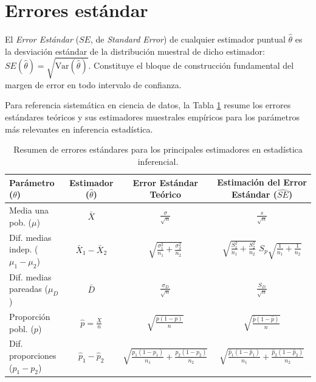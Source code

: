 \section{Errores estándar}

El \emph{Error Estándar} ($SE$, de \emph{Standard Error}) de cualquier estimador puntual $\hat{\theta}$ es la desviación estándar de la distribución muestral de dicho estimador: $SE(\hat{\theta}) = \sqrt{\text{Var}(\hat{\theta})}$. Constituye el bloque de construcción fundamental del margen de error en todo intervalo de confianza.

Para referencia sistemática en ciencia de datos, la Tabla \ref{tab:errores_estandar} resume los errores estándares teóricos y sus estimadores muestrales empíricos para los parámetros más relevantes en inferencia estadística.

\begin{table}[h!]
	\centering
	\begin{tabular}{lccc}
		\hline
		\textbf{Parámetro ($\theta$)} & \textbf{Estimador ($\hat{\theta}$)} & \textbf{Error Estándar Teórico} & \textbf{Estimación del Error Estándar ($\widehat{SE}$)} \\ \hline
		Media una pob. ($\mu$) & $\bar{X}$ & $\frac{\sigma}{\sqrt{n}}$ & $\frac{s}{\sqrt{n}}$ \\ [1.5ex]
		Dif. medias indep. ($\mu_1 - \mu_2$) & $\bar{X}_1 - \bar{X}_2$ & $\sqrt{\frac{\sigma_1^2}{n_1} + \frac{\sigma_2^2}{n_2}}$ & $\sqrt{\frac{S_1^2}{n_1} + \frac{S_2^2}{n_2}}$ \text{ o } $S_p \sqrt{\frac{1}{n_1} + \frac{1}{n_2}}$ \\ [1.5ex]
		Dif. medias pareadas ($\mu_D$) & $\bar{D}$ & $\frac{\sigma_D}{\sqrt{n}}$ & $\frac{S_D}{\sqrt{n}}$ \\ [1.5ex]
		Proporción pobl. ($p$) & $\hat{p} = \frac{X}{n}$ & $\sqrt{\frac{p(1-p)}{n}}$ & $\sqrt{\frac{\hat{p}(1-\hat{p})}{n}}$ \\ [1.5ex]
		Dif. proporciones ($p_1 - p_2$) & $\hat{p}_1 - \hat{p}_2$ & $\sqrt{\frac{p_1(1-p_1)}{n_1} + \frac{p_2(1-p_2)}{n_2}}$ & $\sqrt{\frac{\hat{p}_1(1-\hat{p}_1)}{n_1} + \frac{\hat{p}_2(1-\hat{p}_2)}{n_2}}$ \\ \hline
	\end{tabular}
	\caption{Resumen de errores estándares para los principales estimadores en estadística inferencial.}
	\label{tab:errores_estandar}
\end{table}

